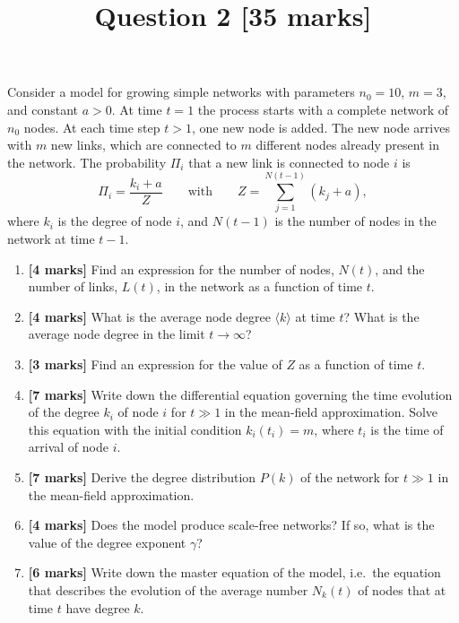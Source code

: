 \documentclass[11pt,a4paper]{article}
\title{Question 2 [35 marks]}
\author{}
\date{}
\begin{document}
\maketitle

Consider a model for growing simple networks with parameters $n_0 = 10$, $m = 3$, and constant $a > 0$. At time $t = 1$ the process starts with a complete network of $n_0$ nodes. At each time step $t > 1$, one new node is added. The new node arrives with $m$ new links, which are connected to $m$ different nodes already present in the network. The probability $\Pi_i$ that a new link is connected to node $i$ is
\[
  \Pi_i = \frac{k_i + a}{Z}
  \qquad\text{with}\qquad
  Z = \sum_{j=1}^{N(t-1)} (k_j + a),
\]
where $k_i$ is the degree of node $i$, and $N(t-1)$ is the number of nodes in the network at time $t-1$.

\begin{enumerate}[label=\textbf{(\alph*)}, leftmargin=*, itemsep=1em]

\item \textbf{[4 marks]}
Find an expression for the number of nodes, $N(t)$, and the number of links, $L(t)$, in the network as a function of time $t$.

\item \textbf{[4 marks]}
What is the average node degree $\langle k \rangle$ at time $t$? What is the average node degree in the limit $t \to \infty$?

\item \textbf{[3 marks]}
Find an expression for the value of $Z$ as a function of time $t$.

\item \textbf{[7 marks]}
Write down the differential equation governing the time evolution of the degree $k_i$ of node $i$ for $t \gg 1$ in the mean-field approximation. Solve this equation with the initial condition $k_i(t_i) = m$, where $t_i$ is the time of arrival of node $i$.

\item \textbf{[7 marks]}
Derive the degree distribution $P(k)$ of the network for $t \gg 1$ in the mean-field approximation.

\item \textbf{[4 marks]}
Does the model produce scale-free networks? If so, what is the value of the degree exponent $\gamma$?

\item \textbf{[6 marks]}
Write down the master equation of the model, i.e.\ the equation that describes the evolution of the average number $N_k(t)$ of nodes that at time $t$ have degree $k$.

\end{enumerate}
\end{document}
